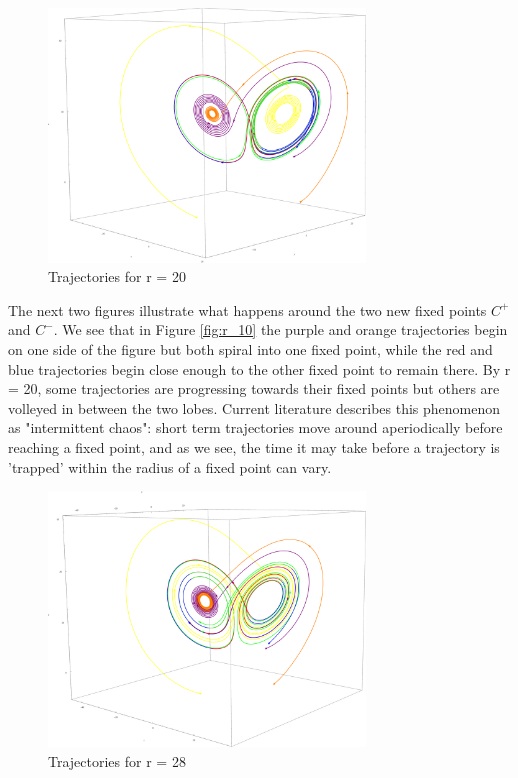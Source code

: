 \documentclass{report}
\begin{document}
\begin{figure}[ht]
  \centering
  \includegraphics[width=0.75\textwidth]{r20.eps}
  \caption{Trajectories for r = 20}
  \label{fig:r_20}
\end{figure}

The next two figures illustrate what happens around the two new fixed points
\(C^+\) and \(C^-\). We see that in Figure \ref{fig:r_10} the purple and
orange trajectories begin on one side of the figure but both spiral into one
fixed point, while the red and blue trajectories begin close enough to the
other fixed point to remain there. By r = 20, some trajectories are progressing
towards their fixed points but others are volleyed in between the two lobes.
Current literature describes this phenomenon as "intermittent chaos": short
term trajectories move around aperiodically before reaching a fixed point,
and as we see, the time it may take before a trajectory is 'trapped' within
the radius of a fixed point can vary.

\begin{figure}[ht]
  \centering
  \includegraphics[width=0.75\textwidth]{r28.eps}
  \caption{Trajectories for r = 28}
  \label{fig:r_28}
\end{figure}
\end{document}
